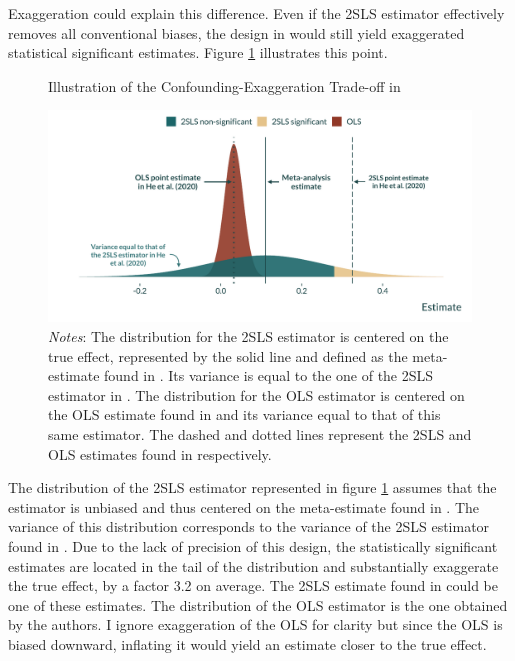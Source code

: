 \documentclass[usletter, 12pt]{article}
\begin{document}
		Exaggeration could explain this difference. Even if the 2SLS estimator effectively removes all conventional biases, the design in \cite{he_straw_2020} would still yield exaggerated statistical significant estimates. Figure \ref{graph_he} illustrates this point. 
				
		\begin{figure}[!h]
                   	\caption{Illustration of the Confounding-Exaggeration Trade-off in \cite{he_straw_2020}}
                        \label{graph_he}
                    	\centering
                    	\includegraphics[width=0.85\linewidth]{images/graph_he_th_annotated.pdf}
                   	 \caption*{\footnotesize \textnormal{\textit{Notes}:  %
	 The distribution for the 2SLS estimator is centered on the true effect, represented by the solid line and defined as the meta-estimate found in \cite{shah_short_2015}. Its variance is equal to the one of the 2SLS estimator in \cite{he_straw_2020}. The distribution for the OLS estimator is centered on the OLS estimate found in \cite{he_straw_2020} and its variance equal to that of this same estimator. The dashed and dotted lines represent the 2SLS and OLS estimates found in \cite{he_straw_2020} respectively.}}
                \end{figure}
				
		The distribution of the 2SLS estimator represented in figure \ref{graph_he} assumes that the estimator is unbiased and thus centered on the meta-estimate found in \cite{shah_short_2015}. The variance of this distribution corresponds to the variance of the 2SLS estimator found in \cite{he_straw_2020}. Due to the lack of precision of this design, the statistically significant estimates are located in the tail of the distribution and substantially exaggerate the true effect, by a factor 3.2 on average. The 2SLS estimate found in \cite{he_straw_2020} could be one of these estimates. The distribution of the OLS estimator is the one obtained by the authors. I ignore exaggeration of the OLS for clarity but since the OLS is biased downward, inflating it would yield an estimate closer to the true effect. 
				
\end{document}
